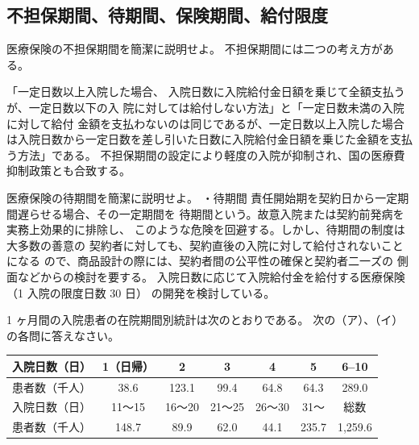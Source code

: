 \documentclass[report,gutter=10mm,fore-edge=10mm,uplatex,dvipdfmx]{jlreq}
\begin{document}
\subsection{不担保期間、待期間、保険期間、給付限度}
医療保険の不担保期間を簡潔に説明せよ。
不担保期間には二つの考え方がある。

「一定日数以上入院した場合、
入院日数に入院給付金日額を乗じて全額支払うが、一定日数以下の入
院に対しては給付しない方法」と「一定日数未満の入院に対して給付
金額を支払わないのは同じであるが、一定日数以上入院した場合は入院日数から一定日数を差し引いた日数に入院給付金日額を乗じた金額を支払う方法」である。
不担保期間の設定により軽度の入院が抑制され、国の医療費抑制政策とも合致する。

医療保険の待期間を簡潔に説明せよ。
・待期間
責任開始期を契約日から一定期間遅らせる場合、その一定期間を
待期間という。故意入院または契約前発病を実務上効果的に排除し、
このような危険を回避する。しかし、待期間の制度は大多数の善意の
契約者に対しても、契約直後の入院に対して給付されないことになる
ので、商品設計の際には、契約者間の公平性の確保と契約者二一ズの
側面などからの検討を要する。
入院日数に応じて入院給付金を給付する医療保険
（1 入院の限度日数 30 日）
の開発を検討している。

1 ヶ月間の入院患者の在院期間別統計は次のとおりである。
次の（ア）、（イ）の各問に答えなさい。
\begin{tabular}[t]{|c|c|c|c|c|c|c|}
\hline 入院日数（日）& 1（日帰）& 2&3 & 4&5 &6--10 \\
 \hline 患者数（千人） &38.6 &123.1 &99.4 &64.8 &64.3 &289.0 \\ \hline
入院日数（日） & 11～15& 16～20& 21～25& 26～30&31～ & 総数\\ \hline
患者数（千人）
 & 148.7
& 89.9& 62.0& 44.1& 235.7& 1,259.6\\ \hline
\end{tabular}
\end{document}
